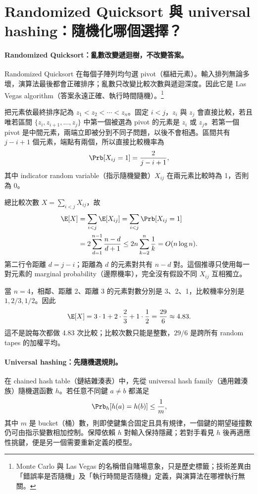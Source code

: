 \documentclass[11pt,a4paper,oneside,openany]{book}
\begin{document}
\section{Randomized Quicksort 與 universal hashing：隨機化哪個選擇？}
\paragraph{Randomized Quicksort：亂數改變遞迴樹，不改變答案。}
Randomized Quicksort 在每個子陣列均勻選 pivot（樞紐元素）。輸入排列無論多壞，演算法最後都會正確排序；亂數只改變比較次數與遞迴深度。因此它是 Las Vegas algorithm（答案永遠正確、執行時間隨機）。\footnote{Monte Carlo 與 Las Vegas 的名稱借自賭場意象，只是歷史標籤；技術差異由「錯誤率是否隨機」及「執行時間是否隨機」定義，與演算法在哪裡執行無關。}

把元素依最終排序記為 $z_1<z_2<\cdots<z_n$。固定 $i<j$，$z_i$ 與 $z_j$ 會直接比較，若且唯若區間
\(
 \{z_i,z_{i+1},\ldots,z_j\}
\)
中第一個被選為 pivot 的元素是 $z_i$ 或 $z_j$。若第一個 pivot 是中間元素，兩端立即被分到不同子問題，以後不會相遇。區間共有 $j-i+1$ 個元素，端點有兩個，所以直接比較機率為
\[
 \Prb[X_{ij}=1]=\frac{2}{j-i+1},
\]
其中 indicator random variable（指示隨機變數）$X_{ij}$ 在兩元素比較時為 1，否則為 0。

總比較次數 $X=\sum_{i<j}X_{ij}$，故
\begin{align}
 \E[X]
 &=\sum_{i<j}\E[X_{ij}]
  =\sum_{i<j}\Prb[X_{ij}=1] \notag\\
 &=2\sum_{d=1}^{n-1}\frac{n-d}{d+1}
 \le 2n\sum_{k=2}^{n}\frac1k
 =O(n\log n).                                           \label{eq:qsort-expectation}
\end{align}
第二行令距離 $d=j-i$；距離為 $d$ 的元素對共有 $n-d$ 對。這個推導只使用每一對元素的 marginal probability（邊際機率），完全沒有假設不同 $X_{ij}$ 互相獨立。

\begin{example}[四個元素時把總和看見]
當 $n=4$，相鄰、距離 2、距離 3 的元素對數分別是 3、2、1，比較機率分別是 $1,2/3,1/2$。因此
\[
 \E[X]=3\cdot1+2\cdot\frac23+1\cdot\frac12
 =\frac{29}{6}\approx4.83.
\]
這不是說每次都做 4.83 次比較；比較次數只能是整數，$29/6$ 是跨所有 random tapes 的加權平均。
\end{example}

\paragraph{Universal hashing：先隨機選規則。}
在 chained hash table（鏈結雜湊表）中，先從 universal hash family（通用雜湊族）隨機選函數 $h$。若任意不同鍵 $a\ne b$ 都滿足
\[
 \Prb_h[h(a)=h(b)]\le\frac1m,
\]
其中 $m$ 是 bucket（桶）數，則即使鍵集合固定且具有規律，一個鍵的期望碰撞數仍可由指示變數相加控制。保障依賴 $h$ 對輸入保持隱藏；若對手看見 $h$ 後再適應性挑鍵，便是另一個需要重新定義的模型。
\end{document}
